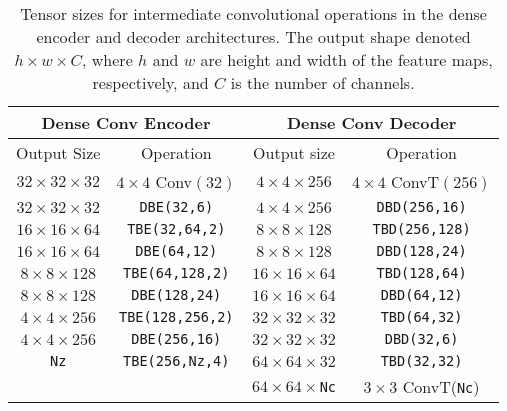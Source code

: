 \documentclass[runningheads]{llncs}
\begin{document}
\begin{table}[ht!]
  \centering
  \begin{tabular}{|c|c|c|c|}
    \hline
    \multicolumn{2}{|c|}{Dense Conv Encoder} & \multicolumn{2}{c|}{Dense Conv Decoder} \\
    \hline
    Output Size & Operation & Output size & Operation \\
    \hline
    \hline
    $32 \times 32 \times 32$ & $4 \times 4$ Conv$(32)$ & $4 \times 4 \times 256$ & $4 \times 4$ ConvT$(256)$ \\
    \hline
    $32 \times 32 \times 32$ & \texttt{DBE(32,6)} & $4 \times 4 \times 256$ & \texttt{DBD(256,16)}\\
    \hline
    $16 \times 16 \times 64$ & \texttt{TBE(32,64,2)} & $8 \times 8 \times 128$ &  \texttt{TBD(256,128)} \\
    \hline
    $16 \times 16 \times 64$ & \texttt{DBE(64,12)} & $8 \times 8 \times 128$ & \texttt{DBD(128,24)} \\
    \hline
    $8 \times 8 \times 128$ & \texttt{TBE(64,128,2)} & $16 \times 16 \times 64$ & \texttt{TBD(128,64)} \\
    \hline
    $8 \times 8 \times 128$ & \texttt{DBE(128,24)} & $16 \times 16 \times 64$ & \texttt{DBD(64,12)} \\
    \hline    
    $4 \times 4 \times 256$ & \texttt{TBE(128,256,2)} & $32 \times 32 \times 32$ & \texttt{TBD(64,32)} \\
    \hline    
    $4 \times 4 \times 256$ & \texttt{DBE(256,16)} & $32 \times 32 \times 32$ & \texttt{DBD(32,6)} \\
    \hline    
    \texttt{Nz}             & \texttt{TBE(256,\texttt{Nz},4)} & $64 \times 64 \times 32$ & \texttt{TBD(32,32)} \\
    \hline    
                          &                                & $64 \times 64 \times $\texttt{Nc} & $3 \times 3$ ConvT(\texttt{Nc}) \\
    \hline         
  \end{tabular}
  \caption{Tensor sizes for intermediate convolutional operations in the dense encoder and decoder architectures.
  The output shape denoted $h \times w \times C$, where $h$ and $w$ are height and width of the feature maps, respectively, 
  and $C$ is the number of channels.}
  \label{tab:dense_architectures}
\end{table}
\end{document}
